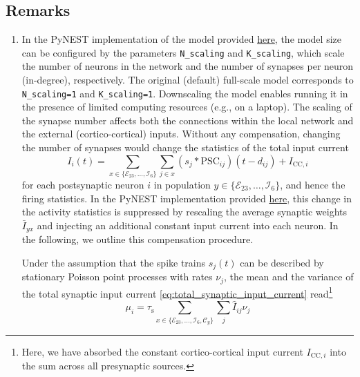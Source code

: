 \documentclass[10pt,a4paper,twoside,american]{article}
\theoremstyle{definitionstyle}
\newcommand{\tauS}{\tau_\text{s}}
\begin{document}
\begin{appendices}
\section{Remarks}
\label{sec:remarks}
\begin{enumerate}
\item \label{remark:network_scaling}
  In the PyNEST implementation of the model provided \href{https://github.com/INM-6/microcircuit-PD14-model}{here}, the model size can be configured by the parameters \texttt{N\_scaling} and \texttt{K\_scaling}, which scale the number of neurons in the network and the number of synapses per neuron (in-degree), respectively. 
  The original (default) full-scale model corresponds to \texttt{N\_scaling=1} and \texttt{K\_scaling=1}.
  Downscaling the model enables running it in the presence of limited computing resources (e.g., on a laptop).
  The scaling of the synapse number affects both the connections within the local network and the external (cortico-cortical) inputs.
  Without any compensation, changing the number of synapses would change the statistics of the total input current
  \begin{equation}
    \label{eq:total_synaptic_input_current}
    I_i(t)=\sum_{x\in\{\mathcal{E}_{23},\ldots,\mathcal{I}_{6}\}} \sum_{j\in{}x} (s_j* \text{PSC}_{ij})(t-d_{ij}) + I_{\text{CC},i}
  \end{equation}
  for each postsynaptic neuron $i$ in population $y\in\{\mathcal{E}_{23},\ldots,\mathcal{I}_{6}\}$, and hence the firing statistics.
  In the PyNEST implementation provided \href{https://github.com/INM-6/microcircuit-PD14-model}{here}, this change in the activity statistics is suppressed by rescaling the average synaptic weights $\bar{I}_{yx}$ and injecting an additional constant input current into each neuron.
  In the following, we outline this compensation procedure.
  \par  
  Under the assumption that the spike trains $s_j(t)$ can be described by stationary Poisson point processes with rates $\nu_j$, the mean and the variance of the total synaptic input current \cref{eq:total_synaptic_input_current} read\footnote{Here, we have absorbed the constant cortico-cortical input current $I_{\text{CC},i}$ into the sum across all presynaptic sources.}
  \begin{equation}
    \label{eq:mean_and_variances_synaptic_input}
      \mu_i      =             \tauS \sum_{x\in\{\mathcal{E}_{23},\ldots,\mathcal{I}_{6},\mathcal{C}_y\}} \sum_j \hat{I}_{ij}   \nu_j 

\end{equation}
\end{enumerate}
\end{appendices}
\end{document}
